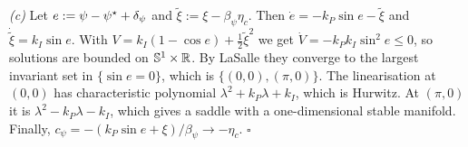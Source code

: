 \emph{(c)} Let $e:=\psi-\psi^\star+\delta_\psi$ and $\tilde\xi:=\xi-\beta_\psi\eta_c$.
Then $\dot e=-k_P\sin e-\tilde\xi$ and $\dot{\tilde\xi}=k_I\sin e$.
With $V=k_I(1-\cos e)+\tfrac12\tilde\xi^2$ we get $\dot V=-k_Pk_I\sin^2e\le0$, so
solutions are bounded on $\mathbb S^1\times\mathbb{R}$.
By LaSalle they converge to the largest invariant set in $\{\sin e=0\}$, which is
$\{(0,0),(\pi,0)\}$.
The linearisation at $(0,0)$ has characteristic polynomial $\lambda^2+k_P\lambda+k_I$,
which is Hurwitz.
At $(\pi,0)$ it is $\lambda^2-k_P\lambda-k_I$, which gives a saddle with a
one-dimensional stable manifold.
Finally, $c_\psi=-(k_P\sin e+\xi)/\beta_\psi\to-\eta_c$.
\hfill$\square$
